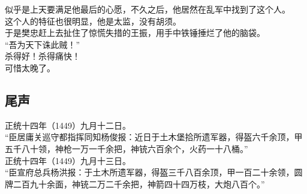 \begin{multicols}{\theparacolNo}
似乎是上天要满足他最后的心愿，不久之后，他居然在乱军中找到了这个人。\\

这个人的特征也很明显，他是太监，没有胡须。\\

于是樊忠赶上去扯住了惊慌失措的王振，用手中铁锤捶烂了他的脑袋。\\

“吾为天下诛此贼！”\\

杀得好！杀得痛快！\\

可惜太晚了。\\

\subsection{尾声}
正统十四年（1449）九月十二日。\\

“臣居庸关巡守都指挥同知杨俊报：近日于土木堡拾所遗军器，得盔六千余顶，甲五千八十领，神枪一万一千余把，神铳六百余个，火药一十八桶。”\\

正统十四年（1449）九月十三日。\\

“臣宣府总兵杨洪报：于土木所遗军器，得盔三千八百余顶，甲一百二十余领，圆牌二百九十余面，神铳二万二千余把，神箭四十四万枝，大炮八百个。”\\
\ifnum{}
	\end{multicols}
\fi
\newpage
